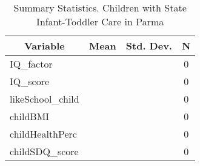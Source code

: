 
\begin{table}[htbp]\centering \caption{Summary Statistics. Children with State Infant-Toddler Care in Parma \label{bothChildasiloStatParma}}
\begin{tabular}{l c c  c}\hline\hline
\multicolumn{1}{c}{\textbf{Variable}} & \textbf{Mean}
 & \textbf{Std. Dev.} & \textbf{N}\\ \hline
IQ\_factor &  &   & 0\\
IQ\_score &  &   & 0\\
likeSchool\_child &  &   & 0\\
childBMI &  &   & 0\\
childHealthPerc &  &   & 0\\
childSDQ\_score &  &   & 0\\
\hline\end{tabular}
\end{table}
